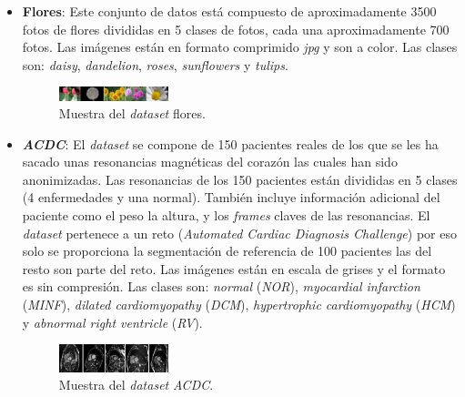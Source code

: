 \documentclass[12pt,a4paper]{article}
\begin{document}
\begin{itemize}
\item \textbf{Flores}: Este conjunto de datos está compuesto de aproximadamente 3500 fotos de flores divididas en 5 clases de fotos, cada una aproximadamente 700 fotos. Las imágenes están en formato comprimido \textit{jpg} y son a color. Las clases son: \textit{daisy}, \textit{dandelion}, \textit{roses}, \textit{sunflowers} y \textit{tulips}.

\begin{figure}[H]
\centering
\includegraphics[width=0.3\textwidth]{img/flores}
\caption{Muestra del \textit{dataset} flores.}
\end{figure}

\item \textbf{\textit{ACDC}}: El \textit{dataset} se compone de 150 pacientes reales de los que se les ha sacado unas resonancias magnéticas del corazón las cuales han sido anonimizadas. Las resonancias de los 150 pacientes están divididas en 5 clases (4 enfermedades y una normal). También incluye información adicional del paciente como el peso la altura, y los \textit{frames} claves de las resonancias. El \textit{dataset} pertenece a un reto (\textit{Automated Cardiac Diagnosis Challenge}) por eso solo se proporciona la segmentación de referencia de 100 pacientes las del resto son parte del reto. Las imágenes están en escala de grises y el formato es sin compresión. Las clases son: \textit{normal} (\textit{NOR}), \textit{myocardial infarction} (\textit{MINF}), \textit{dilated cardiomyopathy} (\textit{DCM}), \textit{hypertrophic cardiomyopathy} (\textit{HCM}) y \textit{abnormal right ventricle} (\textit{RV}).

\begin{figure}[H]
\centering
\includegraphics[width=0.3\textwidth]{img/acdc}
\caption{Muestra del \textit{dataset} \textit{ACDC}.}
\end{figure}




\end{itemize}
\end{document}
